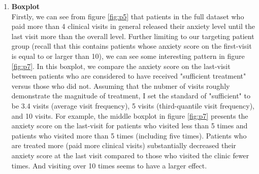 \documentclass[11pt]{article}
\begin{document}
\begin{enumerate}
	\item \textbf{Boxplot}\\
	Firstly, we can see from figure \ref{fig:p5} that patients in the full dataset who paid more than 4 clinical visits in general released their anxiety level until the last visit more than the overall level. Further limiting to our targeting patient group (recall that this contains patients whose anxiety score on the first-visit is equal to or larger than 10), we can see some interesting pattern in figure \ref{fig:p7}. In this boxplot, we compare the anxiety score on the last-visit between patients who are considered to have received "sufficient treatment" versus those who did not. Assuming that the nubmer of visits roughly demonstrate the magnitude of treatment, I set the standard of "sufficient" to be 3.4 visits (average visit frequency), 5 visits (third-quantile visit frequency), and 10 visits. For example, the middle boxplot in figure \ref{fig:p7} presents the anxiety score on the last-visit for patients who visited less than 5 times and patients who visited more than 5 times (including five times). Patients who are treated more (paid more clinical visits) substantially decreased their anxiety score at the last visit compared to those who visited the clinic fewer times. And visiting over 10 times seems to have a larger effect.
	

\end{enumerate}
\end{document}
